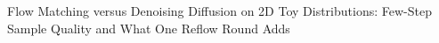 Flow Matching versus Denoising Diffusion on 2D Toy Distributions: Few-Step Sample Quality and What One Reflow Round Adds
